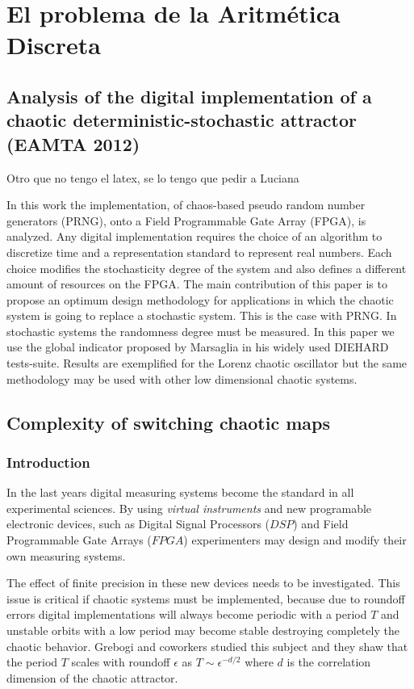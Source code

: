 \chapter{El problema de la Aritmética Discreta}

\section{Analysis of the digital implementation of a chaotic deterministic-stochastic attractor (EAMTA 2012)}

Otro que no tengo el latex, se lo tengo que pedir a Luciana

In this work the implementation, of chaos-based
pseudo random number generators (PRNG), onto a Field Programmable Gate Array (FPGA), is analyzed. Any digital implementation requires the choice of an algorithm to discretize
time and a representation standard to represent real numbers.
Each choice modifies the stochasticity degree of the system and
also defines a different amount of resources on the FPGA. The
main contribution of this paper is to propose an optimum design
methodology for applications in which the chaotic system is going
to replace a stochastic system. This is the case with PRNG. In
stochastic systems the randomness degree must be measured. In
this paper we use the global indicator proposed by Marsaglia
in his widely used DIEHARD tests-suite. Results are exemplified
for the Lorenz chaotic oscillator but the same methodology may
be used with other low dimensional chaotic systems.

\section{Complexity of switching chaotic maps}

\subsection{Introduction}
In the last years digital measuring systems become the standard in
all experimental sciences. By using \emph{virtual instruments} and new programable electronic
devices, such as Digital Signal Processors ($DSP$) and Field
Programmable Gate Arrays ($FPGA$)  experimenters may design and
modify their own measuring systems.

The effect of finite precision in these new devices needs to be
investigated. This issue is critical if  chaotic systems must be implemented, because due to roundoff errors digital implementations will always become periodic with a period $T$ and unstable orbits with a low period may become stable destroying completely the chaotic behavior.  
Grebogi and coworkers \cite{Grebogi1988} studied this subject and they shaw that the period $T$ scales with roundoff $\epsilon$ as
$T\sim\epsilon^{-d/2}$ where $d$ is the correlation dimension of
the chaotic attractor. 

